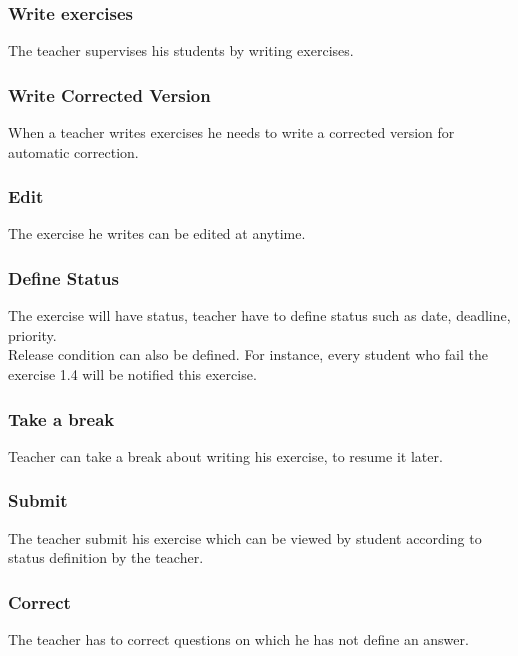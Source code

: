 		\subsubsection{Write exercises}
			The teacher supervises his students by writing exercises.
		\subsubsection{Write Corrected Version}
			When a teacher writes exercises he needs to write a corrected version for automatic correction.
		\subsubsection{Edit}
			The exercise he writes can be edited at anytime.
		\subsubsection{Define Status}
			The exercise will have status, teacher have to define status such as date, deadline, priority.\\
			Release condition can also be defined. For instance, every student who fail the exercise 1.4 will be notified this exercise. 
		\subsubsection{Take a break}
			Teacher can take a break about writing his exercise, to resume it later.
		\subsubsection{Submit}
			The teacher submit his exercise which can be viewed by student according to status definition by the teacher.
		\subsubsection{Correct}
			The teacher has to correct questions on which he has not define an answer.
	\newpage
